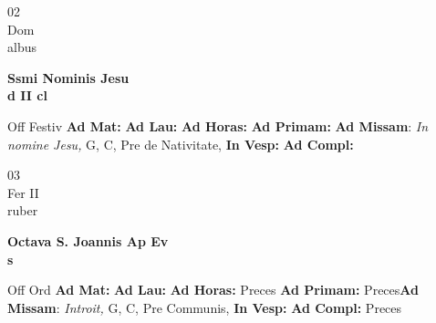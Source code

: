 \documentclass[10pt, openany]{book}
\begin{document}
    \begin{center}
        \begin{minipage}{3.5in}
            \vspace{2em}
            \begin{minipage}{0.5in}
                {\Huge 02} \\
                {\normalsize Dom} \\
                {\normalsize albus}
            \end{minipage}
            \begin{minipage}{3.0in}
                \textbf{ \large Ssmi Nominis Jesu \\
                \textnormal{\normalsize d II cl}} \\ 
            \end{minipage}
            \begin{justify}Off Festiv
                \textbf{Ad Mat: }
                \textbf{Ad Lau: }
                \textbf{Ad Horas: }
                \textbf{Ad Primam: }\textbf{Ad Missam}: \textit{In nomine Jesu,} G, C, Pre de Nativitate,  
                \textbf{In Vesp: }
                \textbf{Ad Compl: }
            \end{justify}
        \end{minipage}
    \end{center}

    \begin{center}
        \begin{minipage}{3.5in}
            \vspace{2em}
            \begin{minipage}{0.5in}
                {\Huge 03} \\
                {\normalsize Fer II} \\
                {\normalsize ruber}
            \end{minipage}
            \begin{minipage}{3.0in}
                \textbf{ \large Octava S. Joannis Ap Ev \\
                \textnormal{\normalsize s}} \\ 
            \end{minipage}
            \begin{justify}Off Ord
                \textbf{Ad Mat: }
                \textbf{Ad Lau: }
                \textbf{Ad Horas: }Preces
                \textbf{Ad Primam: }Preces\textbf{Ad Missam}: \textit{Introit,} G, C, Pre Communis,  
                \textbf{In Vesp: }
                \textbf{Ad Compl: }Preces
            \end{justify}
        \end{minipage}
    \end{center}
\end{document}
